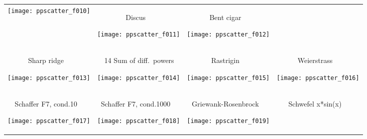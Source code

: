 \documentclass[sigconf]{acmart}
\begin{document}
\begin{figure*}
\begin{tabular}{*{4}{@{}c@{}}}
    \texttt{[image: ppscatter\_f010]}&
\begin{turn}{90}\parbox{0.21\textwidth}{\hfill{} Discus \hfill~}\end{turn} 
    \texttt{[image: ppscatter\_f011]}&
\begin{turn}{90}\parbox{0.21\textwidth}{\hfill{} Bent cigar \hfill~}\end{turn} 
    \texttt{[image: ppscatter\_f012]}\\[-2.2ex]
\begin{turn}{90}\parbox{0.21\textwidth}{\hfill{} Sharp ridge \hfill~}\end{turn} 
    \texttt{[image: ppscatter\_f013]}&
\begin{turn}{90}\parbox{0.21\textwidth}{\hfill\sf~~14 Sum of diff.\ powers \hfill~}\end{turn} 
    \texttt{[image: ppscatter\_f014]}&
\begin{turn}{90}\parbox{0.21\textwidth}{\hfill{} Rastrigin \hfill~}\end{turn} 
    \texttt{[image: ppscatter\_f015]}&
\begin{turn}{90}\parbox{0.21\textwidth}{\hfill{} Weierstrass \hfill~}\end{turn} 
    \texttt{[image: ppscatter\_f016]}\\[-2.2ex]
\begin{turn}{90}\parbox{0.21\textwidth}{\hfill{} Schaffer F7, cond.10 \hfill~}\end{turn} 
    \texttt{[image: ppscatter\_f017]}&
\begin{turn}{90}\parbox{0.21\textwidth}{\hfill{} Schaffer F7, cond.1000 \hfill~}\end{turn} 
    \texttt{[image: ppscatter\_f018]}&
\begin{turn}{90}\parbox{0.21\textwidth}{\hfill{} Griewank-Rosenbrock \hfill~}\end{turn} 
    \texttt{[image: ppscatter\_f019]}&
\begin{turn}{90}\parbox{0.21\textwidth}{\hfill{} Schwefel x*sin(x) \hfill~}\end{turn} 

\end{tabular}
\end{figure*}
\end{document}
